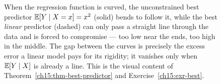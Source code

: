 \begin{figure}[H]
\centering
{}
\caption{When the regression function is curved, the unconstrained best predictor
$\operatorname{\mathbb{E}}[Y\mid X=x] = x^2$ (solid) bends to follow it, while the best \emph{linear} predictor (dashed) can
only pass a straight line through the data and is forced to compromise --- too low near the ends, too
high in the middle. The gap between the curves is precisely the excess error a linear model pays for its
rigidity; it vanishes only when $\operatorname{\mathbb{E}}[Y\mid X]$ is already a line. This is the visual content of
Theorem~\ref{ch15:thm-best-predictor} and Exercise~\ref{ch15:exr-best}.}
\label{ch15:fig-nonlinear}
\end{figure}

